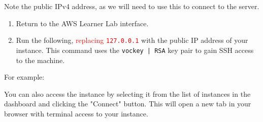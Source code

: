 \documentclass{csse4400}
\begin{document}
\noindent
Note the public IPv4 address, as we will need to use this to connect to the server.

\begin{enumerate}
    \item Return to the AWS Learner Lab interface.
    \item Run the following, \textcolor{red}{replacing \texttt{127.0.0.1}} with the public IP address of your instance.
          This command uses the \texttt{vockey | RSA} key pair to gain SSH access to the machine.
\end{enumerate}

\noindent
For example:
\hspace{5mm}

%
%
%

\vspace{5mm}
\noindent
You can also access the instance by selecting it from the list of instances in the dashboard and clicking the "Connect" button.
This will open a new tab in your browser with terminal access to your instance.
\end{document}
